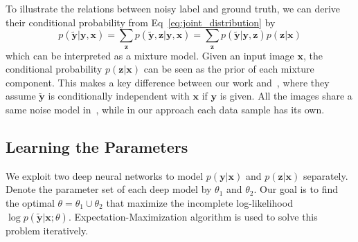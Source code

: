 \documentclass[10pt,twocolumn,letterpaper]{article}
\def\vec{\mathbf}
\begin{document}
To illustrate the relations between noisy label and ground truth, we can derive their conditional probability from Eq~\ref{eq:joint_distribution} by
\begin{equation}
    p(\tilde{\vec{y}} | \vec{y}, \vec{x}) = \sum_{\vec{z}} p(\tilde{\vec{y}}, \vec{z} | \vec{y}, \vec{x}) = \sum_{\vec{z}} p(\tilde{\vec{y}} | \vec{y}, \vec{z}) p(\vec{z} | \vec{x})
\end{equation}
which can be interpreted as a mixture model. Given an input image $\vec{x}$, the conditional probability $p(\vec{z} | \vec{x})$ can be seen as the prior of each mixture component. This makes a key difference between our work and~\cite{sukhbaatar2014learning}, where they assume $\tilde{\vec{y}}$ is conditionally independent with $\vec{x}$ if $\vec{y}$ is given. All the images share a same noise model in~\cite{sukhbaatar2014learning}, while in our approach each data sample has its own.

\subsection{Learning the Parameters} %
\label{sub:learning_the_parameters}
We exploit two deep neural networks to model $p(\vec{y} | \vec{x})$ and $p(\vec{z} | \vec{x})$ separately. Denote the parameter set of each deep model by $\theta_1$ and $\theta_2$. Our goal is to find the optimal $\theta = \theta_1 \cup \theta_2$ that maximize the incomplete log-likelihood $\log p(\tilde{\vec{y}} | \vec{x}; \theta)$. Expectation-Maximization algorithm is used to solve this problem iteratively.
\end{document}
